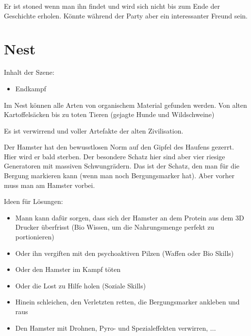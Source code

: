 \begin{npcBox}[title=Lucien\, Director]
    \begin{stressSection}
    \end{stressSection}
    \begin{tabularx}{\textwidth}{ XX }
    \end{tabularx}

    \begin{consequences}
    \item {}
    \item {}
    \item {}
    \end{consequences}

    \begin{npcDescription}
    Er ist stoned wenn man ihn findet und wird sich nicht bis zum Ende der Geschichte erholen. Könnte während der Party aber ein interessanter Freund sein.
    \end{npcDescription}

\end{npcBox}

\section{Nest}

Inhalt der Szene:
\begin{itemize}
\item Endkampf
\end{itemize}

Im Nest können alle Arten von organischem Material gefunden werden. Von alten Kartoffelsäcken bis zu toten Tieren (gejagte Hunde und Wildschweine)

Es ist verwirrend und voller Artefakte der alten Zivilisation.

Der Hamster hat den bewusstlosen Norm auf den Gipfel des Haufens gezerrt. Hier wird er bald sterben.
Der besondere Schatz hier sind aber vier riesige Generatoren mit massiven Schwungrädern. Das ist der Schatz, den man für die Bergung markieren kann (wenn man noch Bergungsmarker hat). Aber vorher muss man am Hamster vorbei.

Ideen für Lösungen:
\begin{itemize}
\item Mann kann dafür sorgen, dass sich der Hamster an dem Protein aus dem 3D Drucker überfrisst (Bio Wissen, um die Nahrungsmenge perfekt zu portionieren)
\item Oder ihn vergiften mit den psychoaktiven Pilzen (Waffen oder Bio Skills)
\item Oder den Hamster im Kampf töten
\item Oder die Lost zu Hilfe holen (Soziale Skills)
\item Hinein schleichen, den Verletzten retten, die Bergungsmarker ankleben und raus
\item Den Hamster mit Drohnen, Pyro- und Spezialeffekten verwirren, ...
\end{itemize}


